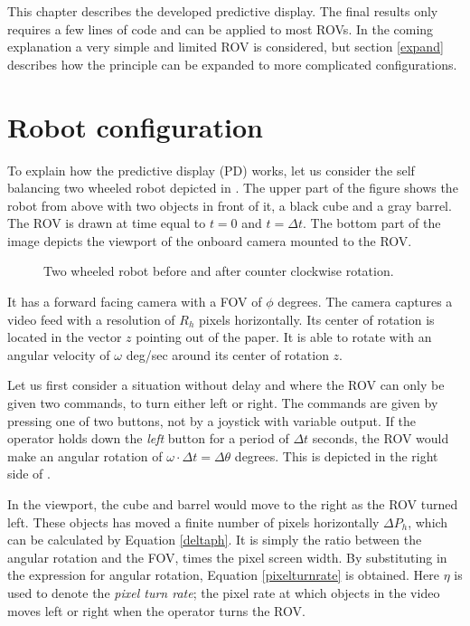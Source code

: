 This chapter describes the developed predictive display. The final results only requires a few lines of code and can be applied to most ROVs. In the coming explanation a very simple and limited ROV is considered, but section \ref{expand} describes how the principle can be expanded to more complicated configurations.

\section{Robot configuration} \label{chp31}
 
To explain how the predictive display (PD) works, let us consider the self balancing two wheeled robot depicted in . The upper part of the figure shows the robot from above with two objects in front of it, a black cube and a gray barrel. The ROV is drawn at time equal to $t=0$ and $t=\Delta t$. The bottom part of the image depicts the viewport of the onboard camera mounted to the ROV.


\begin{figure}[h!]    
    \centering           
    \def\svgwidth{.75\columnwidth}
    
    \caption{Two wheeled robot before and after counter clockwise rotation.}
    \label{twoWheeled}
\end{figure}


It has a forward facing camera with a FOV of $\phi$ degrees. The camera captures a video feed with a resolution of $R_h$ pixels horizontally. Its center of rotation is located in the vector $z$ pointing out of the paper. It is able to rotate with an angular velocity of $\omega$ deg/sec around its center of rotation $z$.

Let us first consider a situation without delay and where the ROV can only be given two commands, to turn either left or right. The commands are given by pressing one of two buttons, not by a joystick with variable output. If the operator holds down the \emph{left} button for a period of $\Delta t$ seconds, the ROV would make an angular rotation of $\omega \cdot \Delta t = \Delta \theta$ degrees. This is depicted in the right side of .

In the viewport, the cube and barrel would move to the right as the ROV turned left. These objects has moved a finite number of pixels horizontally $\Delta P_h$, which can be calculated by Equation \ref{deltaph}. It is simply the ratio between the angular rotation and the FOV, times the pixel screen width. By substituting in the expression for angular rotation, Equation \ref{pixelturnrate} is obtained. Here $\eta$ is used to denote the \textit{pixel turn rate}; the pixel rate at which objects in the video moves left or right when the operator turns the ROV.

